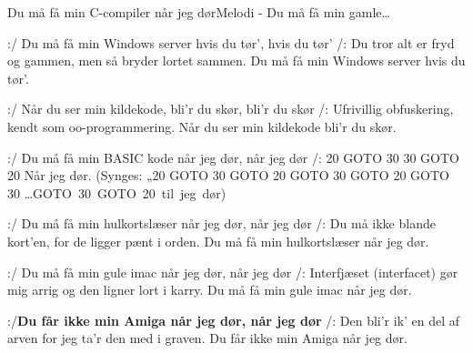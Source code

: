 \begin{sang}{Du må få min C-compiler når jeg dør}{Melodi - Du må få min gamle…}
\begin{vers}
\end{vers}
\newpage
\begin{vers}
:/ Du må få min Windows server hvis du tør', hvis du tør' /:
Du tror alt er fryd og gammen, men så bryder lortet sammen.
Du må få min Windows server hvis du tør'.
\end{vers}
\begin{vers}
:/ Når du ser min kildekode, bli'r du skør, bli'r du skør /:
Ufrivillig obfuskering, kendt som oo-programmering.
Når du ser min kildekode bli'r du skør.
\end{vers}
\begin{vers}
:/ Du må få min BASIC kode når jeg dør, når jeg dør /:
20 GOTO 30
30 GOTO 20
Når jeg dør.
(Synges: „20 GOTO 30 GOTO 20 GOTO 30 GOTO 20 GOTO 30 \ldots GOTO~30~GOTO~20~til~jeg~dør)
\end{vers}
\begin{vers}
:/ Du må få min hulkortslæser når jeg dør, når jeg dør /:
Du må ikke blande kort'en, for de ligger pænt i orden.
Du må få min hulkortslæser når jeg dør.
\end{vers}
\begin{vers}
:/ Du må få min gule imac når jeg dør, når jeg dør /:
Interfjæset (interfacet) gør mig arrig og den ligner lort i karry.
Du må få min gule imac når jeg dør.
\end{vers}
\begin{vers}
:/{\bf Du får ikke min Amiga når jeg dør, når jeg dør} /:
Den bli'r ik' en del af arven for jeg ta'r den med i graven.
Du får ikke min Amiga når jeg dør. 
\end{vers}

\end{sang}